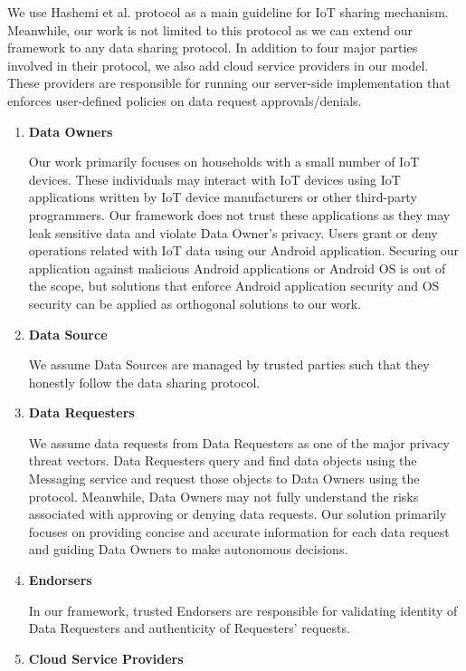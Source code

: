 We use Hashemi et al. \cite{campbell} protocol as a main guideline for IoT sharing mechanism. Meanwhile, our work is not limited to this protocol as we can extend our framework to any data sharing protocol. In addition to four major parties involved in their protocol, we also add cloud service providers in our model. These providers are responsible for running our server-side implementation that enforces user-defined policies on data request approvals/denials. 

\begin{enumerate}
\item \textbf {Data Owners} 

Our work primarily focuses on households with a small number of IoT devices. These individuals may interact with IoT devices using IoT applications written by IoT device manufacturers or other third-party programmers. Our framework does not trust these applications as they may leak sensitive data and violate Data Owner's privacy. Users grant or deny operations related with IoT data using our Android application. Securing our application against malicious Android applications or Android OS is out of the scope, but solutions that enforce Android application security and OS security \cite{tz} can be applied as orthogonal solutions to our work.

\item \textbf{Data Source} 

We assume Data Sources are managed by trusted parties such that they honestly follow the data sharing protocol.  

\item \textbf {Data Requesters}

We assume data requests from Data Requesters as one of the major privacy threat vectors. Data Requesters query and find data objects using the Messaging service and request those objects to Data Owners using the protocol. Meanwhile, Data Owners may not fully understand the risks associated with approving or denying data requests. Our solution primarily focuses on providing concise and accurate information for each	 data request and guiding Data Owners to make autonomous decisions.

\item \textbf {Endorsers}

In our framework, trusted Endorsers are responsible for validating identity of Data Requesters and authenticity of Requesters' requests.

\item \textbf {Cloud Service Providers}


\end{enumerate}
